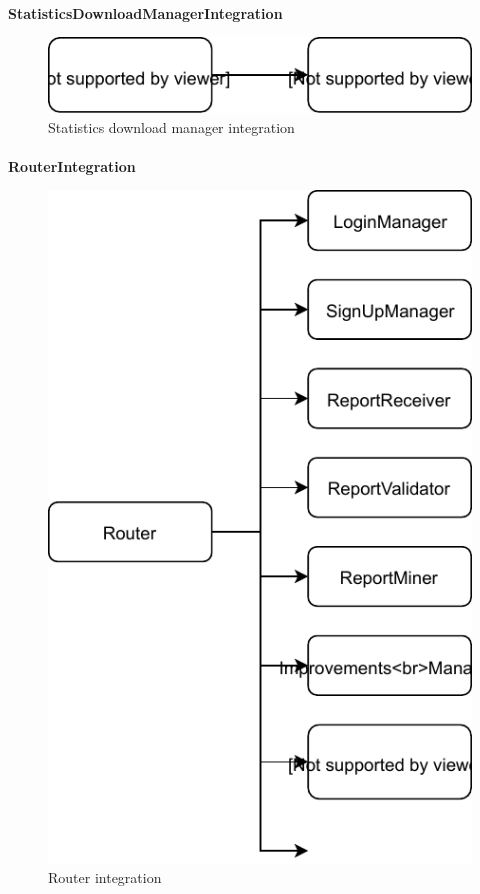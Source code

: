 			\paragraph{}
				\textbf{StatisticsDownloadManagerIntegration}
					\begin{figure}
						\centering
						\includegraphics[width=\textwidth]{images/Integration/StatisticsDownloadManagerIntegration.pdf}
						\caption{Statistics download manager integration}
					\end{figure}
			\paragraph{}
				\textbf{RouterIntegration}
					\begin{figure}
						\centering
						\includegraphics[width=\textwidth]{images/Integration/RouterIntegration.pdf}
						\caption{Router integration}
					\end{figure}

